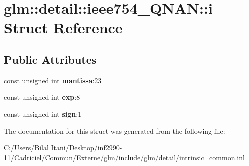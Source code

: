 \hypertarget{structglm_1_1detail_1_1ieee754___q_n_a_n_1_1i}{}\section{glm\+:\+:detail\+:\+:ieee754\+\_\+\+Q\+N\+AN\+:\+:i Struct Reference}
\label{structglm_1_1detail_1_1ieee754___q_n_a_n_1_1i}
\subsection*{Public Attributes}
\begin{DoxyCompactItemize}
\item 
const unsigned int {\bfseries mantissa}\+:23\hypertarget{structglm_1_1detail_1_1ieee754___q_n_a_n_1_1i_a1999926defcba631a716bee7d3044d0a}{}\label{structglm_1_1detail_1_1ieee754___q_n_a_n_1_1i_a1999926defcba631a716bee7d3044d0a}

\item 
const unsigned int {\bfseries exp}\+:8\hypertarget{structglm_1_1detail_1_1ieee754___q_n_a_n_1_1i_abc8cdb38ff3aa6a09214f7bfa32efac8}{}\label{structglm_1_1detail_1_1ieee754___q_n_a_n_1_1i_abc8cdb38ff3aa6a09214f7bfa32efac8}

\item 
const unsigned int {\bfseries sign}\+:1\hypertarget{structglm_1_1detail_1_1ieee754___q_n_a_n_1_1i_a5dd7e174864b6a8cd045563dde44f305}{}\label{structglm_1_1detail_1_1ieee754___q_n_a_n_1_1i_a5dd7e174864b6a8cd045563dde44f305}

\end{DoxyCompactItemize}


The documentation for this struct was generated from the following file\+:\begin{DoxyCompactItemize}
\item 
C\+:/\+Users/\+Bilal Itani/\+Desktop/inf2990-\/11/\+Cadriciel/\+Commun/\+Externe/glm/include/glm/detail/intrinsic\+\_\+common.\+inl\end{DoxyCompactItemize}
